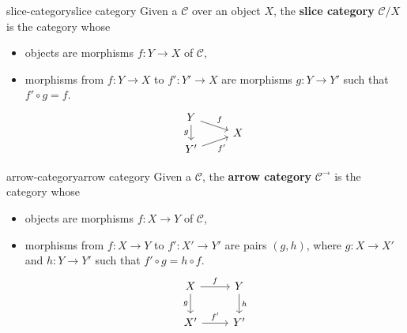 
\begin{topic}{slice-category}{slice category}
    Given a  $\mathcal{C}$ over an object $X$, the \textbf{slice category} $\mathcal{C}/X$ is the category whose
    \begin{itemize}
        \item objects are morphisms $f \colon Y \to X$ of $\mathcal{C}$,
        \item morphisms from $f \colon Y \to X$ to $f' \colon Y' \to X$ are morphisms $g \colon Y \to Y'$ such that $f' \circ g = f$.
        \[ \svg \begin{tikzcd}[row sep=0em] Y \arrow{rd}{f} \arrow[swap]{dd}{g} & \\ & X \\ Y' \arrow[swap]{ur}{f'} & \end{tikzcd} \]
    \end{itemize}
\end{topic}

\begin{topic}{arrow-category}{arrow category}
    Given a  $\mathcal{C}$, the \textbf{arrow category} $\mathcal{C}^\rightarrow$ is the category whose
    \begin{itemize}
        \item objects are morphisms $f \colon X \to Y$ of $\mathcal{C}$,
        \item morphisms from $f \colon X \to Y$ to $f' \colon X' \to Y'$ are pairs $(g, h)$, where $g \colon X \to X'$ and $h \colon Y \to Y'$ such that $f' \circ g = h \circ f$.
        \[ \svg \begin{tikzcd} X \arrow{r}{f} \arrow[swap]{d}{g} & Y \arrow{d}{h} \\ X' \arrow{r}{f'} & Y' \end{tikzcd} \]
    \end{itemize}
\end{topic}

